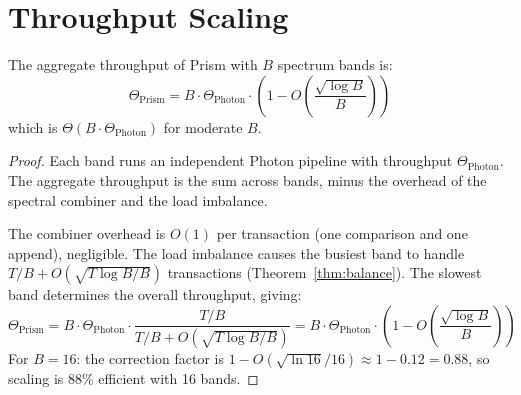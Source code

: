 \section{Throughput Scaling}

\label{sec:throughput}

\begin{theorem}
\label{thm:scaling}
The aggregate throughput of Prism with $B$ spectrum bands is:
\[
\Theta_{\text{Prism}} = B \cdot \Theta_{\text{Photon}} \cdot \left(1 - O\left(\frac{\sqrt{\log B}}{B}\right)\right)
\]
which is $\Theta(B \cdot \Theta_{\text{Photon}})$ for moderate $B$.
\end{theorem}

\begin{proof}
Each band runs an independent Photon pipeline with throughput $\Theta_{\text{Photon}}$.
The aggregate throughput is the sum across bands, minus the overhead of the spectral
combiner and the load imbalance.

The combiner overhead is $O(1)$ per transaction (one comparison and one append), negligible.
The load imbalance causes the busiest band to handle $T/B + O(\sqrt{T\log B / B})$
transactions (Theorem~\ref{thm:balance}). The slowest band determines the overall
throughput, giving:
\[
\Theta_{\text{Prism}} = B \cdot \Theta_{\text{Photon}} \cdot \frac{T/B}{T/B + O(\sqrt{T\log B/B})}
= B \cdot \Theta_{\text{Photon}} \cdot \left(1 - O\left(\frac{\sqrt{\log B}}{B}\right)\right)
\]
For $B = 16$: the correction factor is $1 - O(\sqrt{\ln 16}/16) \approx 1 - 0.12 = 0.88$,
so scaling is 88\% efficient with 16 bands.
\end{proof}


